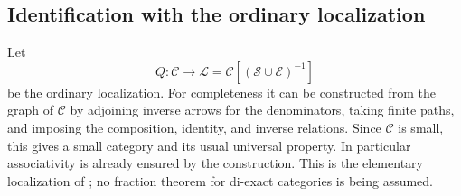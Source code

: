\documentclass[11pt,reqno,a4paper]{amsart}
\theoremstyle{definition}
\theoremstyle{remark}
\newcommand{\C}{\mathcal{C}}
\newcommand{\0}{\mathbf{0}}
\renewcommand{\1}{\mathbf{1}}
\newcommand{\Sden}{\mathcal S}
\newcommand{\Eden}{\mathcal E}
\newcommand{\Loc}{\mathcal L}
\begin{document}
\subsection{Identification with the ordinary localization}\label{di:sec:fractions}

Let
\[
 Q:\C\longrightarrow\Loc=\C[(\Sden\cup\Eden)^{-1}]
\]
be the ordinary localization. For completeness it can be constructed from the graph of $\C$ by adjoining inverse arrows for the denominators, taking finite paths, and imposing the composition, identity, and inverse relations. Since $\C$ is small, this gives a small category and its usual universal property. In particular associativity is already ensured by the construction. This is the elementary localization of \cite[Chapter~I]{GZ}; no fraction theorem for di-exact categories is being assumed.
\end{document}
